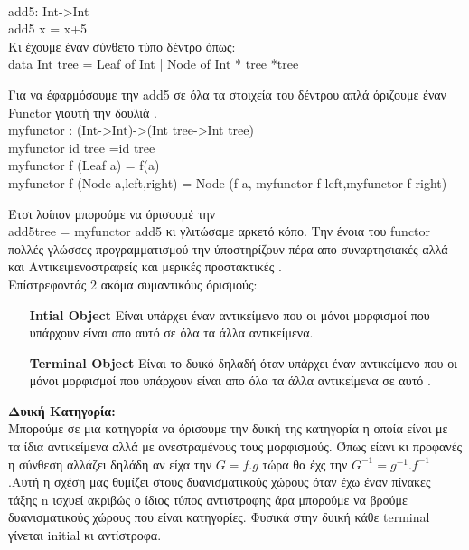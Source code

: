 \documentclass{article}
\begin{document}
\\add5: Int->Int
\\add5 x = x+5  \\
Κι έχουμε έναν σύνθετο τύπο δέντρο όπως:\\
data Int tree = Leaf of Int | Node of Int * tree *tree 

Για να έφαρμόσουμε την add5 σε όλα τα στοιχεία του δέντρου απλά όριζουμε έναν Functor γιαυτή την δουλιά .
\\myfunctor : (Int->Int)->(Int tree->Int tree)
\\myfunctor id  tree =id tree
\\myfunctor f (Leaf a) = f(a) 
\\myfunctor f (Node a,left,right) = Node (f a, myfunctor f left,myfunctor f right)

Έτσι λοίπον μπορούμε να όρισουμέ την \\ add5tree = myfunctor add5 
κι γλιτώσαμε αρκετό κόπο.
Την ένοια του functor πολλές γλώσσες προγραμματισμού την ύποστηρίζουν πέρα απο συναρτησιακές αλλά και Αντικειμενοστραφείς και μερικές προστακτικές .
\\
Επίστρεφοντάς 2 ακόμα συμαντικόυς όρισμούς: \\
\begin{itemize}
 	\item [\textbf{Intial Object}] Είναι υπάρχει έναν αντικείμενο που οι μόνοι μορφισμοί που υπάρχουν είναι απο αυτό σε όλα τα άλλα αντικείμενα.
	\item [\textbf{Terminal Object}] Είναι το δυικό δηλαδή όταν υπάρχει έναν αντικείμενο που οι μόνοι μορφισμοί που υπάρχουν είναι απο  όλα τα άλλα αντικείμενα σε αυτό .
\end{itemize}
\large {\textbf{Δυική Κατηγορία:}}\\
Μπορούμε σε μια κατηγορία να όρισουμε την δυική της κατηγορία η οποία είναι με τα ίδια αντικείμενα αλλά με ανεστραμένους τους μορφισμούς. Όπως είανι κι προφανές η σύνθεση αλλάζει δηλάδη αν είχα την $G=f.g$ τώρα θα έχς την $G^{-1}=g^{-1}.f^{-1}$ .Αυτή η σχέση μας θυμίζει στους δυανισματικούς χώρους όταν έχω έναν πίνακες τάξης n ισχυεί ακριβώς ο ίδιος τύπος αντιστροφης άρα μπορούμε να βρούμε δυανισματικούς χώρους που είναι κατηγορίες. Φυσικά στην δυική κάθε terminal γίνεται initial κι αντίστροφα.
\end{document}
